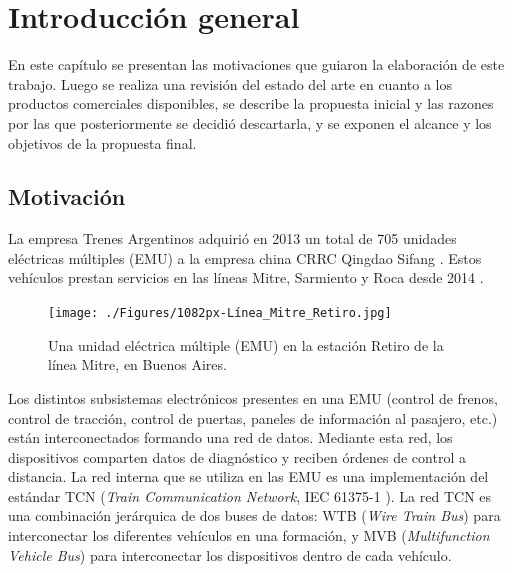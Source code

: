 \chapter{Introducción general}

En este capítulo se presentan las motivaciones que guiaron la elaboración de este trabajo. Luego se realiza una revisión del estado del arte en cuanto a los productos comerciales disponibles, se describe la propuesta inicial y las razones por las que posteriormente se decidió descartarla, y se exponen el alcance y los objetivos de la propuesta final.

\label{cap:IntroGeneral}

\section{Motivación}

La empresa Trenes Argentinos \cite{web:sofse} adquirió en 2013 un total de 705 unidades eléctricas múltiples (EMU) a la empresa china CRRC Qingdao Sifang \cite{web:sifang} \cite{licitacion1}. Estos vehículos prestan servicios en las líneas Mitre, Sarmiento y Roca desde 2014 \cite{emu:roca} \cite{emu:mitre-sarmiento}.

\begin{figure}[htbp]
	\centering
	\texttt{[image: ./Figures/1082px-Línea\_Mitre\_Retiro.jpg]}
	\caption[Unidad eléctrica múltiple (EMU)]{Una unidad eléctrica múltiple (EMU) en la estación Retiro de la línea Mitre, en Buenos Aires.\footnotemark}
	\label{fig:emu}
\end{figure}

Los distintos subsistemas electrónicos presentes en una EMU (control de frenos, control de tracción, control de puertas, paneles de información al pasajero, etc.) están interconectados formando una red de datos. Mediante esta red, los dispositivos comparten datos de diagnóstico y reciben órdenes de control a distancia. La red interna que se utiliza en las EMU es una implementación del estándar TCN (\textit{Train Communication Network}, IEC 61375-1 \cite{iec61375-1}). La red TCN es una combinación jerárquica de dos buses de datos: WTB (\textit{Wire Train Bus}) para interconectar los diferentes vehículos en una formación, y MVB (\textit{Multifunction Vehicle Bus}) para interconectar los dispositivos dentro de cada vehículo.

